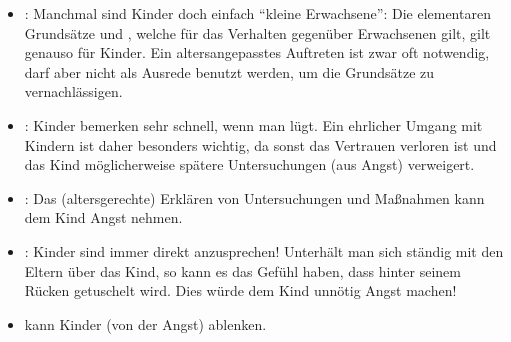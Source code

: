 {\begin{itemize}
  \item {}: Manchmal sind Kinder doch
  einfach \enquote{kleine Erwachsene}: Die elementaren Grundsätze
   und , welche für das
  Verhalten gegenüber Erwachsenen gilt, gilt genauso für
  Kinder. Ein altersangepasstes Auftreten ist zwar oft
  notwendig, darf aber nicht als Ausrede benutzt werden, um
  die Grundsätze zu vernachlässigen.
% 
  \item {}: Kinder bemerken sehr schnell, wenn man lügt. Ein
  ehrlicher Umgang mit Kindern ist daher besonders wichtig, da sonst das
  Vertrauen verloren ist und das Kind möglicherweise spätere Untersuchungen
  (aus Angst) verweigert.
  \item {}: Das (altersgerechte) Erklären von Untersuchungen und
  Maßnahmen kann dem Kind Angst nehmen.
  \item {}: Kinder sind immer direkt anzusprechen!
  Unterhält man sich ständig mit den Eltern über das Kind, so kann es das Gefühl
  haben, dass hinter seinem Rücken getuschelt wird. Dies würde dem Kind unnötig
  Angst machen!
  \item {} kann Kinder (von der Angst) ablenken. 

\end{itemize}}
